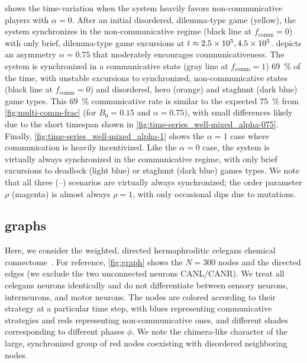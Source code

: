 \documentclass[10pt,letterpaper]{article}
\begin{document}
 shows the time-variation
when the system heavily favors non-communicative players
with $\alpha = 0$.
After an initial disordered, dilemma-type game (yellow),
the system synchronizes in the non-communicative regime
(black line at $f_{\text{comm}} = 0$)
with only brief, dilemma-type game excursions at $t \approx
\num{2.5E5},\num{4.5E5}$.
 depicts an asymmetry $\alpha = 0.75$
that moderately encourages communicativeness.
The system is synchronized in a communicative state
(gray line at $f_{\text{comm}} = 1$) \SI{69}{\percent} of the time,
with unstable excursions to synchronized, non-communicative states
(black line at $f_{\text{comm}} = 0$)
and disordered, hero (orange) and staghunt (dark blue) game types.
This \SI{69}{\percent} communicative rate is similar to the expected \SI{75}{\percent}
from \cref{fig:multi-comm-frac} (for $B_0 = 0.15$ and $\alpha = 0.75$),
with small differences likely due to the short timespan shown in
\cref{fig:time-series_well-mixed_alpha-075}.
Finally, \cref{fig:time-series_well-mixed_alpha-1} shows the
$\alpha = 1$ case where communication is heavily incentivized.
Like the  $\alpha = 0$ case,
the system is virtually always synchronized in the communicative regime,
with only brief excursions to deadlock (light blue)
or staghunt (dark blue) games types.
We note that all three
(--)
scenarios are virtually always synchronized;
the order parameter $\rho$ (magenta) is almost always $\rho = 1$,
with only occasional dips due to mutations.

\subsection{ graphs}\label{sec:elegans_graph}

Here, we consider the weighted, directed hermaphroditic \gls{celegans}
chemical connectome~\cite{cook2019whole}.
For reference, \cref{fig:graph} shows the $N = 300$ nodes and the directed edges
(we exclude the two unconnected neurons CANL/CANR).
We treat all \gls{celegans} neurons identically
and do not differentiate between sensory neurons, interneurons, and
motor neurons.
The nodes are colored according to their strategy at a particular time step,
with blues representing communicative strategies
and reds representing non-communicative ones,
and different shades corresponding to different phases $\phi$.
We note the chimera-like character
of the large, synchronized group of red nodes
coexisting with disordered neighboring nodes.
\end{document}
